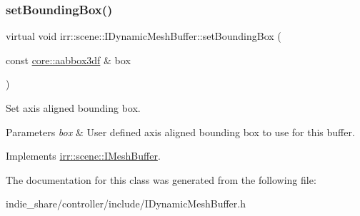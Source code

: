 \subsubsection{\texorpdfstring{set\+Bounding\+Box()}{setBoundingBox()}}
{\footnotesize\ttfamily virtual void irr\+::scene\+::\+I\+Dynamic\+Mesh\+Buffer\+::set\+Bounding\+Box (\begin{DoxyParamCaption}\item[{const \hyperlink{namespaceirr_1_1core_adfc8fa01b30044c55f3332a1d6c1aa19}{core\+::aabbox3df} \&}]{box }\end{DoxyParamCaption})\hspace{0.3cm}{\ttfamily [pure virtual]}}



Set axis aligned bounding box. 


\begin{DoxyParams}{Parameters}
{\em box} & User defined axis aligned bounding box to use for this buffer. \\
\hline
\end{DoxyParams}


Implements \hyperlink{classirr_1_1scene_1_1IMeshBuffer_adbbfb7757dfbba7357193d2280893df6}{irr\+::scene\+::\+I\+Mesh\+Buffer}.



The documentation for this class was generated from the following file\+:\begin{DoxyCompactItemize}
\item 
indie\+\_\+share/controller/include/I\+Dynamic\+Mesh\+Buffer.\+h\end{DoxyCompactItemize}
